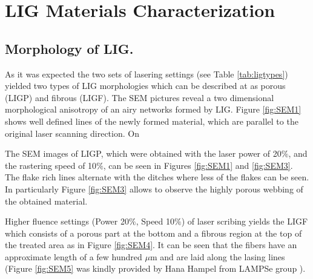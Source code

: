\section{LIG Materials Characterization}


\subsection{Morphology of LIG.}

As it was expected the two sets of lasering settings (see Table \ref{tab:ligtypes}) yielded two types of LIG morphologies which can be described at as porous (LIGP) and fibrous (LIGF). The SEM pictures reveal a two dimensional morphological anisotropy of an airy networks formed by LIG. Figure \ref{fig:SEM1} shows well defined lines of the newly formed material, which are parallel to the original laser scanning direction.
On

The SEM images of LIGP, which were obtained with the laser power of 20$\%$, and the rastering speed of 10$\%$,  can be seen in Figures \ref{fig:SEM1} and \ref{fig:SEM3}. The flake rich lines alternate with the ditches where less of the flakes can be seen. In particularly Figure \ref{fig:SEM3} allows to observe the highly porous webbing of the obtained material.  

Higher fluence settings (Power 20$\%$, Speed 10$\%$) of laser scribing yields the LIGF which consists of a porous part at the bottom and a fibrous region at the top of the treated area as in Figure \ref{fig:SEM4}. It can be seen that the fibers have an approximate length of a few hundred $\mu$m and are laid along the lasing lines (Figure \ref{fig:SEM5} was kindly provided by Hana Hampel from LAMPSe group \cite{hana}). 

